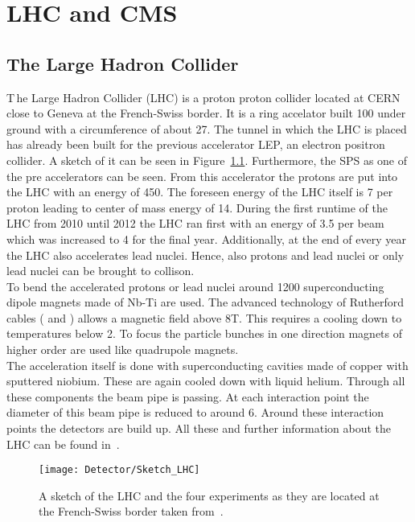 \chapter{LHC and CMS \label{sec:LHCCMS}}

\section{The Large Hadron Collider \label{LHCCMSLHC}}

\lettrine[lines=2]{T}{\,}he Large Hadron Collider (LHC) is a proton proton collider located at CERN close to Geneva at the French-Swiss border. It is a ring accelator built 100\m{} under ground with a circumference of about 27\km{}. The tunnel in which the LHC is placed has already been built for the previous accelerator LEP, an electron positron collider. A sketch of it can be seen in Figure~\ref{plot:LCHSketch}. Furthermore, the SPS as one of the pre accelerators can be seen. From this accelerator the protons are put into the LHC with an energy of 450\GeV{}. The foreseen energy of the LHC itself is 7\TeV{} per proton leading to center of mass energy of 14\TeV{}. During the first runtime of the LHC from 2010 until 2012 the LHC ran first with an energy of 3.5\TeV{} per beam which was increased to 4\TeV{} for the final year. Additionally, at the end of every year the LHC also accelerates lead nuclei. Hence, also protons and lead nuclei or only lead nuclei can be brought to collison. \\
To bend the accelerated protons or lead nuclei around 1200 superconducting dipole magnets made of Nb-Ti are used. The advanced technology of Rutherford cables (\cite{RuthCables1} and \cite{RuthCables2}) allows a magnetic field above 8\unit{T}. This requires a cooling down to temperatures below 2\K{}. To focus the particle bunches in one direction magnets of higher order are used like quadrupole magnets. \\
The acceleration itself is done with superconducting cavities made of copper with sputtered niobium. These are again cooled down with liquid helium. Through all these components the beam pipe is passing. At each interaction point the diameter of this beam pipe is reduced to around 6\cm{}. Around these interaction points the detectors are build up. All these and further information about the LHC can be found in~.

\begin{figure}[!ht]
  \centering
  \texttt{[image: Detector/Sketch\_LHC]}
  \caption[Sketch of the LHC]{A sketch of the LHC and the four experiments as they are located at the French-Swiss border taken from~\cite{Team:40525}. \label{plot:LCHSketch}}
\end{figure}

